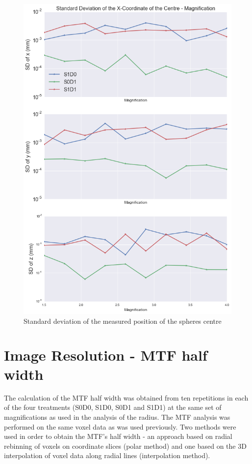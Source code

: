 \documentclass[
  twoside,
  11pt, a4paper,
  footinclude=true,
  headinclude=true,
  cleardoublepage=empty
]{scrbook}
\begin{document}
\begin{figure}[h!]
  \centering
    \includegraphics[width=\textwidth]{code/RadiusMeasurements/Plots_RadiusCentre_files/Plots_RadiusCentre_7_0.png}
    \caption{Standard deviation of the measured position of the spheres centre}
        \label{spherecentrevar}
\end{figure}


\section{Image Resolution - MTF half width}

The calculation of the MTF half width was obtained from ten repetitions in each of the four treatments (S0D0, S1D0, S0D1 and S1D1) at the same set of magnifications as used in the analysis of the radius. The MTF analysis was performed on the same voxel data as was used previously. Two methods were used in order to obtain the MTF's half width - an approach based on radial rebinning of voxels on coordinate slices (polar method) and one based on the 3D interpolation of voxel data along radial lines (interpolation method).
\end{document}
